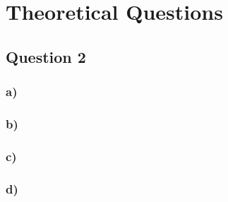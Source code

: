 \section*{Theoretical Questions}
\subsection*{Question 2}


\subsubsection*{a)}
\noindent 


\subsubsection*{b)}
\noindent 


\subsubsection*{c)}
\noindent 

\subsubsection*{d)}
\noindent 
